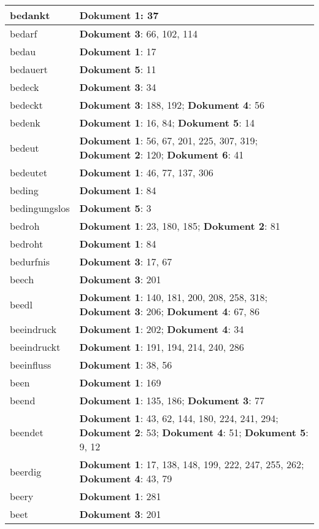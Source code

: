 \documentclass[a5paper]{article}
\begin{document}
\begin{longtable}[l]{|l|p{3in}|}
\hline
bedankt & \textbf{Dokument 1}: 37 \\
\hline
bedarf & \textbf{Dokument 3}: 66, 102, 114 \\
\hline
bedau & \textbf{Dokument 1}: 17 \\
\hline
bedauert & \textbf{Dokument 5}: 11 \\
\hline
bedeck & \textbf{Dokument 3}: 34 \\
\hline
bedeckt & \textbf{Dokument 3}: 188, 192; \textbf{Dokument 4}: 56 \\
\hline
bedenk & \textbf{Dokument 1}: 16, 84; \textbf{Dokument 5}: 14 \\
\hline
bedeut & \textbf{Dokument 1}: 56, 67, 201, 225, 307, 319; \textbf{Dokument 2}: 120; \textbf{Dokument 6}: 41 \\
\hline
bedeutet & \textbf{Dokument 1}: 46, 77, 137, 306 \\
\hline
beding & \textbf{Dokument 1}: 84 \\
\hline
bedingungslos & \textbf{Dokument 5}: 3 \\
\hline
bedroh & \textbf{Dokument 1}: 23, 180, 185; \textbf{Dokument 2}: 81 \\
\hline
bedroht & \textbf{Dokument 1}: 84 \\
\hline
bedurfnis & \textbf{Dokument 3}: 17, 67 \\
\hline
beech & \textbf{Dokument 3}: 201 \\
\hline
beedl & \textbf{Dokument 1}: 140, 181, 200, 208, 258, 318; \textbf{Dokument 3}: 206; \textbf{Dokument 4}: 67, 86 \\
\hline
beeindruck & \textbf{Dokument 1}: 202; \textbf{Dokument 4}: 34 \\
\hline
beeindruckt & \textbf{Dokument 1}: 191, 194, 214, 240, 286 \\
\hline
beeinfluss & \textbf{Dokument 1}: 38, 56 \\
\hline
been & \textbf{Dokument 1}: 169 \\
\hline
beend & \textbf{Dokument 1}: 135, 186; \textbf{Dokument 3}: 77 \\
\hline
beendet & \textbf{Dokument 1}: 43, 62, 144, 180, 224, 241, 294; \textbf{Dokument 2}: 53; \textbf{Dokument 4}: 51; \textbf{Dokument 5}: 9, 12 \\
\hline
beerdig & \textbf{Dokument 1}: 17, 138, 148, 199, 222, 247, 255, 262; \textbf{Dokument 4}: 43, 79 \\
\hline
beery & \textbf{Dokument 1}: 281 \\
\hline
beet & \textbf{Dokument 3}: 201 \\

\end{longtable}
\end{document}
